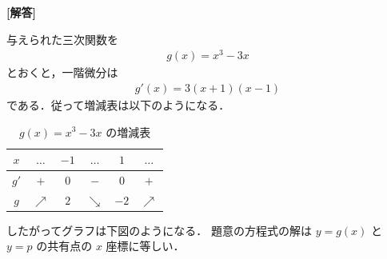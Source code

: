 \documentclass[../../main.tex]{subfiles}
\begin{document}
\begin{oframed}
  
\end{oframed}

{\bf [解答]}

与えられた三次関数を
\begin{align}
  g(x) = x^3 -3x \label{eq:1}
\end{align}
とおくと，一階微分は
\begin{align}
  g'(x) = 3(x+1)(x-1) \label{eq:2}
\end{align}
である．従って増減表は以下のようになる．

\begin{table}[htb]
  \centering
  \caption{$g(x) = x^3-3x$ の増減表}
  \begin{tabular}{c|c|c|c|c|c}
    $x$ & $\dots$ & $-1$ & $\dots$ & $1$ & $\dots$ \\ \hline
    $g'$ & $+$ & $0$ & $-$ & $0$ & $+$ \\ \hline
    $g$ & $\nearrow$ & $2$ & $\searrow$ & $-2$ & $\nearrow$
  \end{tabular}
\end{table}

したがってグラフは下図のようになる．
題意の方程式の解は $y = g(x)$ と $y = p$ の共有点の $x$ 座標に等しい．
\end{document}
